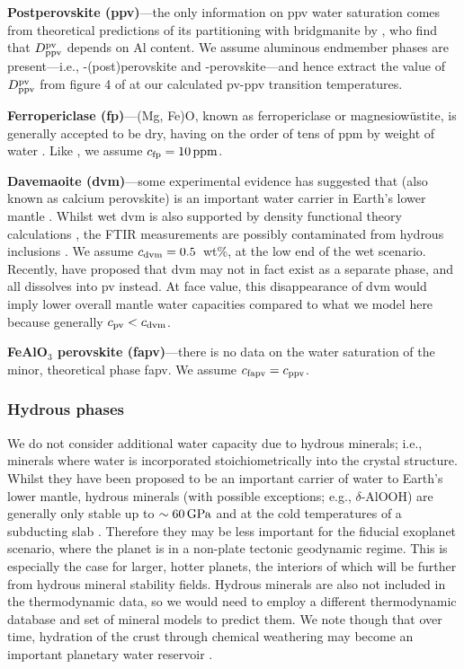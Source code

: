 \documentclass[fleqn,usenatbib]{mnras}
\begin{document}
\textbf{Postperovskite (ppv)}---the only information on ppv water saturation comes from theoretical predictions of its partitioning with bridgmanite by \citet{townsend_water_2016}, who find that $D^{\rm pv}_{\rm ppv}$ depends on Al content. We assume aluminous endmember phases are present---i.e., -(post)perovskite and -perovskite---and hence extract the value of $D^{\rm pv}_{\rm ppv}$ from figure 4 of \citet{townsend_water_2016} at our calculated pv-ppv transition temperatures.

\textbf{Ferropericlase (fp)}---(Mg, Fe)O, known as ferropericlase or magnesiow\"ustite, is generally accepted to be dry, having on the order of tens of ppm by weight of water \citep{bolfan-casanova_pressure_2002, litasov_influence_2010}. Like \citet{dong_constraining_2021}, we assume $c_{\rm fp} = 10\,{\rm ppm}$.

\textbf{Davemaoite (dvm)}---some experimental evidence has suggested that  (also known as calcium perovskite) is an important water carrier in Earth's lower mantle \citep{chen_possible_2020}. Whilst wet dvm is also supported by density functional theory calculations \citep{shim_water_2022}, the FTIR measurements are possibly contaminated from hydrous inclusions \citep{chen_possible_2020}. We assume $c_{\rm dvm} = 0.5$~wt\%, at the low end of the wet scenario. Recently, \citet{ko_calcium_2022} have proposed that dvm may not in fact exist as a separate phase, and all  dissolves into pv instead. At face value, this disappearance of dvm would imply lower overall mantle water capacities compared to what we model here because generally $c_{\rm pv} < c_{\rm dvm}$.

\textbf{FeAlO$_3$ perovskite (fapv)}---there is no data on the water saturation of the minor, theoretical phase fapv. We assume $c_{\rm fapv} = c_{\rm ppv}$.



\subsubsection{Hydrous phases}

We do not consider additional water capacity due to hydrous minerals; i.e., minerals where water is incorporated stoichiometrically into the crystal structure. Whilst they have been proposed to be an important carrier of water to Earth's lower mantle, hydrous minerals (with possible exceptions; e.g., $\delta$-AlOOH) are generally only stable up to $\sim60\,{\rm GPa}$ and at the cold temperatures of a subducting slab \citep{ohtani_hydrous_2015}. Therefore they may be less important for the fiducial exoplanet scenario, where the planet is in a non-plate tectonic geodynamic regime. This is especially the case for larger, hotter planets, the interiors of which will be further from hydrous mineral stability fields. Hydrous minerals are also not included in the \citet{stixrude_thermal_2022} thermodynamic data, so we would need to employ a different thermodynamic database and set of mineral models to predict them. We note though that over time, hydration of the crust through chemical weathering may become an important planetary water reservoir \citep[e.g.,][]{scheller_long-term_2021}.
\end{document}
